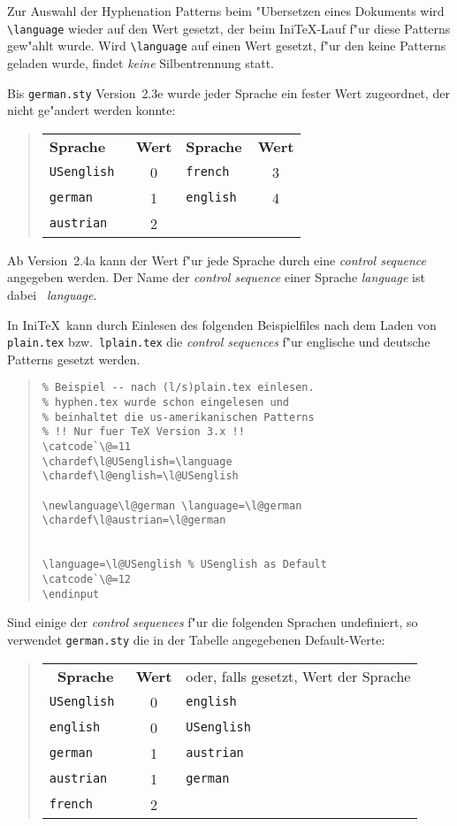 Zur Auswahl der Hyphenation Patterns beim "Ubersetzen eines
Dokuments wird \verb:\language: wieder auf den Wert gesetzt, der
beim Ini\TeX-Lauf f"ur diese Patterns gew"ahlt wurde.
Wird \verb:\language: auf einen Wert gesetzt, f"ur den keine
Patterns geladen wurde, findet {\it keine\/} Silbentrennung statt.

Bis {\tt german.sty} Version~2.3e wurde jeder Sprache ein fester
Wert zugeordnet, der nicht ge"andert werden konnte:
\begin{quote}
\begin{tabular}{lc@{\kern\tabcolsep\qquad}lc}
\bf Sprache&\bf Wert&\bf Sprache&\bf Wert\\
 \tt USenglish & 0& \tt french    & 3\\
 \tt german    & 1& \tt english   & 4\\
 \tt austrian  & 2
\end{tabular}
\end{quote}

Ab Version~2.4a kann der Wert f"ur jede Sprache durch eine {\em
control sequence\/} angegeben werden.  Der Name der {\em control
sequence\/} einer Sprache {\em language\/} ist dabei \mbox{{\tt
\string\l@}\em language}.

In Ini\TeX\ kann durch Einlesen des folgenden Beispielfiles nach dem
Laden von {\tt plain.tex} bzw.\ {\tt lplain.tex} die {\em control
sequences\/} f"ur englische und deutsche Patterns gesetzt werden.

\goodbreak
\begin{quote}
\begin{verbatim}
% Beispiel -- nach (l/s)plain.tex einlesen.
% hyphen.tex wurde schon eingelesen und
% beinhaltet die us-amerikanischen Patterns
% !! Nur fuer TeX Version 3.x !!
\catcode`\@=11
\chardef\l@USenglish=\language
\chardef\l@english=\l@USenglish

\newlanguage\l@german \language=\l@german
\chardef\l@austrian=\l@german


\language=\l@USenglish % USenglish as Default
\catcode`\@=12
\endinput
\end{verbatim}
\end{quote}

Sind einige der {\em control sequences\/} f"ur die folgenden
Sprachen undefiniert, so verwendet \verb:german.sty: die in der
Tabelle angegebenen Default-Werte:
\begin{quote}
\begin{tabular}{lcl}
\multicolumn{1}{c}{\bf Sprache}&\bf Wert&oder,
  falls gesetzt, Wert der Sprache\\
 \tt USenglish & 0 & \tt english\\
 \tt english   & 0 & \tt USenglish\\
 \tt german    & 1 & \tt austrian\\
 \tt austrian  & 1 & \tt german\\
 \tt french    & 2
\end{tabular}
\end{quote}


